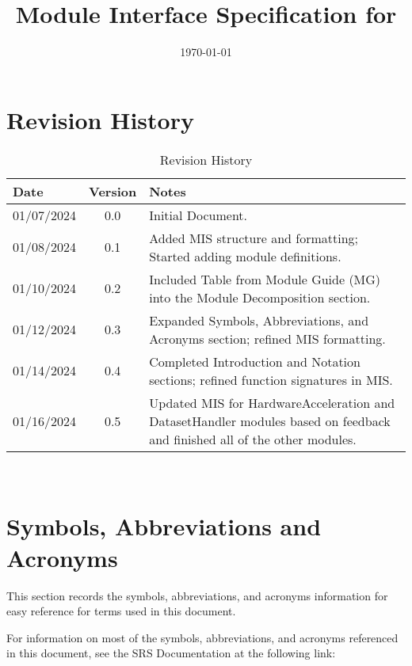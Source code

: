 \documentclass[12pt, titlepage]{article}
\begin{document}
\title{Module Interface Specification for \progname{}}

\author{\authname}

\date{\today}

\maketitle


\section{Revision History}

\renewcommand{\arraystretch}{1.2}
\begin{table}[H]
\centering
\begin{tabularx}{\textwidth}{l c X}
\toprule
\textbf{Date} & \textbf{Version} & \textbf{Notes} \\
\midrule
01/07/2024 & 0.0 & Initial Document. \\
01/08/2024 & 0.1 & Added MIS structure and formatting; Started adding module definitions. \\
01/10/2024 & 0.2 & Included Table from Module Guide (MG) into the Module Decomposition section. \\
01/12/2024 & 0.3 & Expanded Symbols, Abbreviations, and Acronyms section; refined MIS formatting. \\
01/14/2024 & 0.4 & Completed Introduction and Notation sections; refined function signatures in MIS. \\
01/16/2024 & 0.5 & Updated MIS for HardwareAcceleration and DatasetHandler modules based on feedback and finished all of the other modules. \\
\bottomrule
\end{tabularx}
\caption{Revision History}
\label{tab:revision_history}
\end{table}


~\newpage

\section{Symbols, Abbreviations and Acronyms}

This section records the symbols, abbreviations, and acronyms information for easy reference for terms used in this document.

For information on most of the symbols, abbreviations, and acronyms referenced in this document, see the SRS Documentation at the following link:
\end{document}
